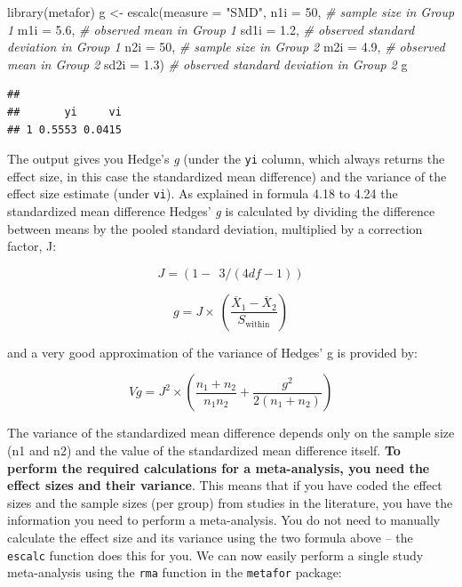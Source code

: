 \documentclass[
  oneside]{krantz}
\makeatletter
\newenvironment{Shaded}{\begin{snugshade}}{\end{snugshade}}
\newcommand{\AttributeTok}[1]{\textcolor[rgb]{0.61,0.61,0.61}{#1}}
\newcommand{\CommentTok}[1]{\textcolor[rgb]{0.37,0.37,0.37}{\textit{#1}}}
\newcommand{\DecValTok}[1]{\textcolor[rgb]{0.06,0.06,0.06}{#1}}
\newcommand{\FloatTok}[1]{\textcolor[rgb]{0.06,0.06,0.06}{#1}}
\newcommand{\FunctionTok}[1]{\textcolor[rgb]{0,0,0}{#1}}
\newcommand{\NormalTok}[1]{#1}
\newcommand{\OtherTok}[1]{\textcolor[rgb]{0.37,0.37,0.37}{#1}}
\newcommand{\StringTok}[1]{\textcolor[rgb]{0.5,0.5,0.5}{#1}}
\newenvironment{kframe}{%
\medskip{}
\setlength{\fboxsep}{.8em}
 \def\at@end@of@kframe{}%
 \ifinner\ifhmode%
  \def\at@end@of@kframe{\end{minipage}}%
  \begin{minipage}{\columnwidth}%
 \fi\fi%
 \def\FrameCommand##1{\hskip\@totalleftmargin \hskip-\fboxsep
 \colorbox{shadecolor}{##1}\hskip-\fboxsep
     \hskip-\linewidth \hskip-\@totalleftmargin \hskip\columnwidth}%
 \MakeFramed {\advance\hsize-\width
   \@totalleftmargin\z@ \linewidth\hsize
   \@setminipage}}%
 {\par\unskip\endMakeFramed%
 \at@end@of@kframe}
\renewenvironment{Shaded}{\begin{kframe}}{\end{kframe}}
\makeatother
\begin{document}
\begin{Shaded}
\begin{Highlighting}[]
\FunctionTok{library}\NormalTok{(metafor)}
\NormalTok{g }\OtherTok{\textless{}{-}} \FunctionTok{escalc}\NormalTok{(}\AttributeTok{measure =} \StringTok{"SMD"}\NormalTok{,}
            \AttributeTok{n1i =} \DecValTok{50}\NormalTok{, }\CommentTok{\# sample size in Group 1}
            \AttributeTok{m1i =} \FloatTok{5.6}\NormalTok{, }\CommentTok{\# observed mean in Group 1}
            \AttributeTok{sd1i =} \FloatTok{1.2}\NormalTok{, }\CommentTok{\# observed standard deviation in Group 1}
            \AttributeTok{n2i =} \DecValTok{50}\NormalTok{, }\CommentTok{\# sample size in Group 2}
            \AttributeTok{m2i =} \FloatTok{4.9}\NormalTok{, }\CommentTok{\# observed mean in Group 2}
            \AttributeTok{sd2i =} \FloatTok{1.3}\NormalTok{) }\CommentTok{\# observed standard deviation in Group 2}
\NormalTok{g}
\end{Highlighting}
\end{Shaded}

\begin{verbatim}
## 
##       yi     vi 
## 1 0.5553 0.0415
\end{verbatim}

The output gives you Hedge's \emph{g} (under the \texttt{yi} column, which always returns the effect size, in this case the standardized mean difference) and the variance of the effect size estimate (under \texttt{vi}). As explained in \citet{borenstein_introduction_2009} formula 4.18 to 4.24 the standardized mean difference Hedges' \emph{g} is calculated by dividing the difference between means by the pooled standard deviation, multiplied by a correction factor, J:

\[
J = (1 - \ \ 3/(4df - 1))
\]

\[
g = J \times \ \left( \frac{{\overline{X}}_{1} - {\overline{X}}_{2}}{S_{\text{within}}} \right)
\]

and a very good approximation of the variance of Hedges' g is provided by:

\[
Vg = J^{2} \times \left( \frac{n_{1} + n_{2}}{n_{1}n_{2}} + \frac{g^{2}}{2(n_{1} + n_{2})} \right)
\]

The variance of the standardized mean difference depends only on the sample size (n1 and n2) and the value of the standardized mean difference itself. \textbf{To perform the required calculations for a meta-analysis, you need the effect sizes and their variance}. This means that if you have coded the effect sizes and the sample sizes (per group) from studies in the literature, you have the information you need to perform a meta-analysis. You do not need to manually calculate the effect size and its variance using the two formula above -- the \texttt{escalc} function does this for you. We can now easily perform a single study meta-analysis using the \texttt{rma} function in the \texttt{metafor} package:
\end{document}

